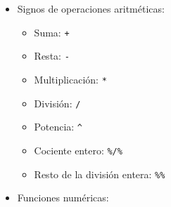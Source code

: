 \documentclass[
]{book}
\providecommand{\tightlist}{%
  \setlength{\itemsep}{0pt}\setlength{\parskip}{0pt}}
\theoremstyle{definition}
\theoremstyle{definition}
\theoremstyle{definition}
\theoremstyle{remark}
\begin{document}
\begin{itemize}
\tightlist
\item
  Signos de operaciones aritméticas:

  \begin{itemize}
  \tightlist
  \item
    Suma: \texttt{+}
  \item
    Resta: \texttt{-}
  \item
    Multiplicación: \texttt{*}
  \item
    División: \texttt{/}
  \item
    Potencia: \texttt{\^{}}
  \item
    Cociente entero: \texttt{\%/\%}
  \item
    Resto de la división entera: \texttt{\%\%}
  \end{itemize}
\item
  Funciones numéricas:


\end{itemize}
\end{document}
